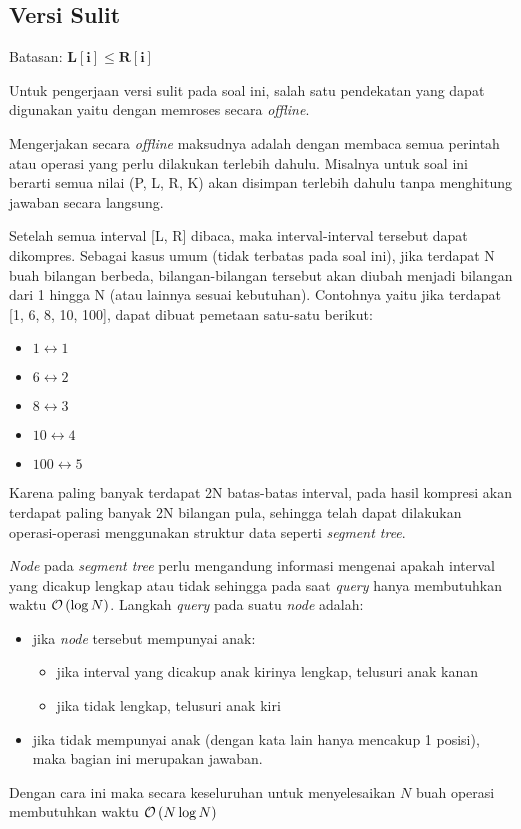 \documentclass[../main_editorial.tex]{subfiles} %
\begin{document}
\subsection*{Versi Sulit}

Batasan: $\mathbf{L[i] \le R[i]}$

Untuk pengerjaan versi sulit pada soal ini, salah satu pendekatan yang dapat digunakan yaitu dengan memroses secara \textit{offline}.

Mengerjakan secara \textit{offline} maksudnya adalah dengan membaca semua perintah atau operasi yang perlu dilakukan terlebih dahulu. Misalnya untuk soal ini berarti semua nilai (P, L, R, K) akan disimpan terlebih dahulu tanpa menghitung jawaban secara langsung.

Setelah semua interval [L, R] dibaca, maka interval-interval tersebut dapat dikompres. Sebagai kasus umum (tidak terbatas pada soal ini), jika terdapat N buah bilangan berbeda, bilangan-bilangan tersebut akan diubah menjadi bilangan dari 1 hingga N (atau lainnya sesuai kebutuhan). Contohnya yaitu jika terdapat [1, 6, 8, 10, 100], dapat dibuat pemetaan satu-satu berikut:
\begin{itemize}
	\item $1 \leftrightarrow 1$
	\item $6 \leftrightarrow 2$
	\item $8 \leftrightarrow 3$
	\item $10 \leftrightarrow 4$
	\item $100 \leftrightarrow 5$
\end{itemize}

Karena paling banyak terdapat 2N batas-batas interval, pada hasil kompresi akan terdapat paling banyak 2N bilangan pula, sehingga telah dapat dilakukan operasi-operasi menggunakan struktur data seperti \textit{segment tree}.

\textit{Node} pada \textit{segment tree} perlu mengandung informasi mengenai apakah interval yang dicakup lengkap atau tidak sehingga pada saat \textit{query} hanya membutuhkan waktu $\mathcal{O}\left( \log N \right)$. Langkah \textit{query} pada suatu \textit{node} adalah:
\begin{itemize}
	\item jika \textit{node} tersebut mempunyai anak:
		\begin{itemize}
			\item jika interval yang dicakup anak kirinya lengkap, telusuri anak kanan
			\item jika tidak lengkap, telusuri anak kiri
		\end{itemize}
	\item jika tidak mempunyai anak (dengan kata lain hanya mencakup 1 posisi), maka bagian ini merupakan jawaban.
\end{itemize}

Dengan cara ini maka secara keseluruhan untuk menyelesaikan $N$ buah operasi membutuhkan waktu $\mathcal{O}\left( N \log N \right)$
\end{document}
